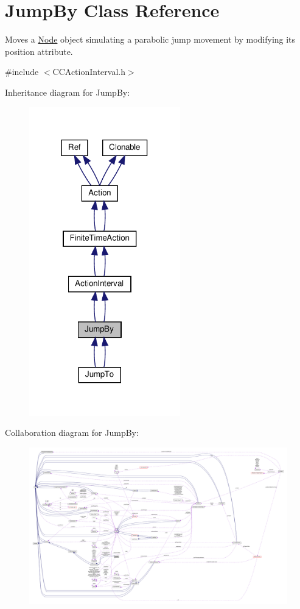 \hypertarget{classJumpBy}{}\section{Jump\+By Class Reference}
\label{classJumpBy}


Moves a \hyperlink{classNode}{Node} object simulating a parabolic jump movement by modifying it\textquotesingle{}s position attribute.  




{\ttfamily \#include $<$C\+C\+Action\+Interval.\+h$>$}



Inheritance diagram for Jump\+By\+:
\nopagebreak
\begin{figure}[H]
\begin{center}
\leavevmode
\includegraphics[width=186pt]{classJumpBy__inherit__graph}
\end{center}
\end{figure}


Collaboration diagram for Jump\+By\+:
\nopagebreak
\begin{figure}[H]
\begin{center}
\leavevmode
\includegraphics[width=350pt]{classJumpBy__coll__graph}
\end{center}
\end{figure}
